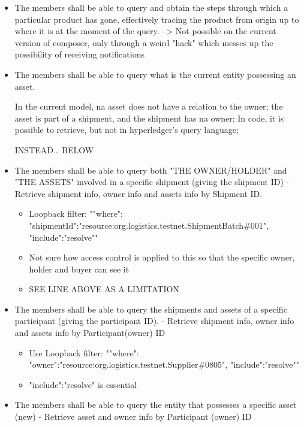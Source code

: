 \begin{itemize}
        \begin{itemize}
			\item The members shall be able to query and obtain the steps through which a particular product has gone, effectively tracing the product from origin up to where it is at the moment of the query. --> Not possible on the current version of composer, only through a weird "hack" which messes up the possibility of receiving notifications
			\item The members shall be able to query what is the current entity possessing an asset.
				\par In the current model, na asset does not have a relation to the owner; the asset is part of a shipment, and the shipment has na owner; In code, it is possible to retrieve, but not in hyperledger's query language;
				\par INSTEAD… BELOW
            \item The members shall be able to query both "THE OWNER/HOLDER" and "THE ASSETS" involved in a specific shipment (giving the shipment ID) - Retrieve shipment info, owner info and assets info by Shipment ID.
                \begin{itemize}
				\item Loopback filter: "{"where": {"shipmentId":"resource:org.logistics.testnet.ShipmentBatch\#001"}, "include":"resolve"}" 
				\item  Not sure how access control is applied to this so that the specific owner, holder and buyer can see it
                \item  SEE LINE ABOVE AS A LIMITATION 
                \end{itemize}
            \item The members shall be able to query the shipments and assets of a specific participant (giving the participant ID). - Retrieve shipment info, owner info and assets info by Participant(owner) ID
            \begin{itemize}
            \item  Use Loopback filter: "{"where": {"owner":"resource:org.logistics.testnet.Supplier\#0805"}, "include":"resolve"}"  
            \item  "include":"resolve" is essential
            \end{itemize}
            \item The members shall be able to query the entity that possesses a specific asset (new) - Retrieve asset and owner info by Participant (owner) ID
            \begin{itemize}

\end{itemize}
\end{itemize}
\end{itemize}

